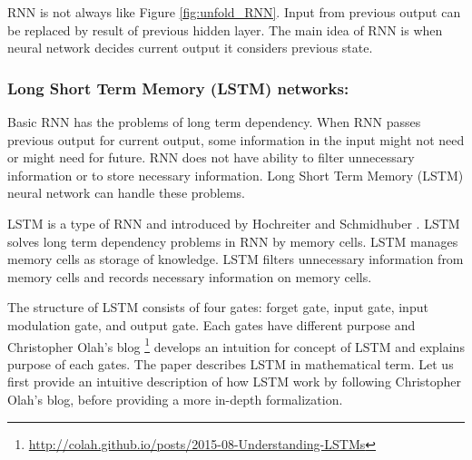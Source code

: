\documentclass[draft,dvipsnames]{drexel-thesis}
\begin{document}
\begin{thesis}
	RNN is not always like Figure \ref{fig:unfold_RNN}. Input from previous output can be replaced by result of previous hidden layer. The main idea of RNN is when neural network decides current output it considers previous state.
	
	
\subsubsection{Long Short Term Memory (LSTM) networks:}\label{LSTM}
	Basic RNN has the problems of long term dependency. When RNN passes previous output for current output, some information in the input might not need or might need for future. RNN does not have ability to filter unnecessary information or to store necessary information. Long Short Term Memory (LSTM) neural network can handle these problems.
	
	LSTM is a type of RNN and introduced by Hochreiter and Schmidhuber \cite{hochreiter1997long}. LSTM solves long term dependency problems in RNN by memory cells. LSTM manages memory cells as storage of knowledge. LSTM filters unnecessary information from memory cells and records necessary information on memory cells.
	
	The structure of LSTM consists of four gates: forget gate, input gate, input modulation gate, and output gate. Each gates have different purpose and Christopher Olah's blog \footnote{\url{http://colah.github.io/posts/2015-08-Understanding-LSTMs}} develops an intuition for concept of LSTM and explains purpose of each gates. The paper \cite{zaremba2014recurrent}  describes LSTM in mathematical term. Let us first provide an intuitive description of how LSTM work by following Christopher Olah's blog, before providing a more in-depth formalization.
	
	

	

\end{thesis}
\end{document}
